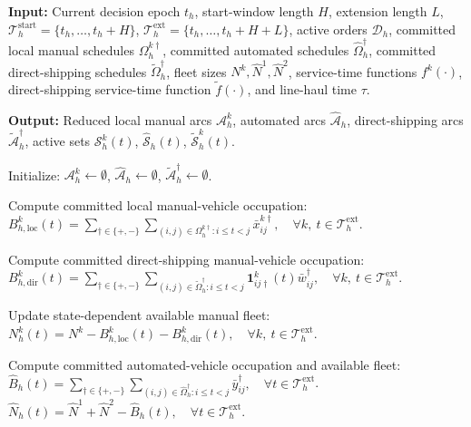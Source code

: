 \documentclass[10pt, reqno]{amsart}
\begin{document}
\begin{algorithm}[!t]
\caption{Rolling-horizon-aware candidate arc generation}
\label{alg:rha can gen}
\begin{algorithmic}[1]

\Statex \textbf{Input:} Current decision epoch $t_h$, start-window length $H$,
extension length $L$,
$\mathcal{T}_h^{\mathrm{start}}=\{t_h,\ldots,t_h+H\}$,
$\mathcal{T}_h^{\mathrm{ext}}=\{t_h,\ldots,t_h+H+L\}$,
active orders $\mathcal{D}_h$,
committed local manual schedules $\Omega_h^{k\dagger}$,
committed automated schedules $\widehat{\Omega}_h^\dagger$,
committed direct-shipping schedules $\widetilde{\Omega}_h^\dagger$,
fleet sizes $N^k,\widehat N^1,\widehat N^2$, service-time functions
$f^k(\cdot)$, direct-shipping service-time function $\widetilde f(\cdot)$,
and line-haul time $\tau$.

\Statex \textbf{Output:} Reduced local manual arcs $\mathcal{A}_h^k$,
automated arcs $\widehat{\mathcal{A}}_h$,
direct-shipping arcs $\widetilde{\mathcal{A}}_h^\dagger$,
active sets $\mathcal{S}_h^k(t)$, $\widehat{\mathcal{S}}_h(t)$,
$\widetilde{\mathcal{S}}_h^k(t)$.

\State Initialize:
$\mathcal{A}_h^k \leftarrow \emptyset$,
$\widehat{\mathcal{A}}_h \leftarrow \emptyset$,
$\widetilde{\mathcal{A}}_h^\dagger \leftarrow \emptyset$.

\State Compute committed local manual-vehicle occupation:
\Statex \quad
$B_{h,\mathrm{loc}}^k(t)
=
\sum_{\dagger\in\{+,-\}}
\sum_{(i,j)\in\Omega_h^{k\dagger}:i\le t<j}
\bar x_{ij}^{k\dagger},
\quad
\forall k,\ t\in\mathcal{T}_h^{\mathrm{ext}}$.

\State Compute committed direct-shipping manual-vehicle occupation:
\Statex \quad
$B_{h,\mathrm{dir}}^k(t)
=
\sum_{\dagger\in\{+,-\}}
\sum_{(i,j)\in\widetilde{\Omega}_h^\dagger:i\le t<j}
\mathbf{1}_{ij\dagger}^k(t)\bar w_{ij}^{\dagger},
\quad
\forall k,\ t\in\mathcal{T}_h^{\mathrm{ext}}$.

\State Update state-dependent available manual fleet:
\Statex \quad
$N_h^k(t)
=
N^k
-
B_{h,\mathrm{loc}}^k(t)
-
B_{h,\mathrm{dir}}^k(t),
\quad
\forall k,\ t\in\mathcal{T}_h^{\mathrm{ext}}$.

\State Compute committed automated-vehicle occupation and available fleet:
\Statex \quad
$\widehat B_h(t)
=
\sum_{\dagger\in\{+,-\}}
\sum_{(i,j)\in\widehat\Omega_h^\dagger:i\le t<j}
\bar y_{ij}^{\dagger},
\quad
\forall t\in\mathcal{T}_h^{\mathrm{ext}}$.
\Statex \quad
$\widehat N_h(t)
=
\widehat N^1+\widehat N^2-\widehat B_h(t),
\quad
\forall t\in\mathcal{T}_h^{\mathrm{ext}}$.


\end{algorithmic}
\end{algorithm}
\end{document}
